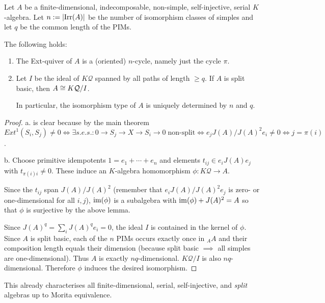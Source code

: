 \documentclass[fontsize=11pt,fleqn,a4paper]{scrartcl}
\begin{document}
\begin{theorem}
Let $A$ be a finite-dimensional, indecomposable, non-simple, self-injective, serial $K$-algebra. Let $n:=\lvert\operatorname{Irr}(A)\rvert$ be the number of isomorphism classes of simples and let $q$ be the common length of the PIMs.

The following holds:
\begin{enumerate}
\item The Ext-quiver of $A$ is a (oriented) $n$-cycle, namely just the cycle $\pi$.
\item Let $I$ be the ideal of $K\mathcal{Q}$ spanned by all paths of length $\geq q$. If $A$ is split basic, then $A\cong K\mathcal{Q}/I$.

In particular, the isomorphism type of $A$ is uniquely determined by $n$ and $q$.
\end{enumerate}
\end{theorem}
\begin{proof}
a. is clear because by the main theorem $Ext^1(S_i,S_j)\neq 0 \iff \exists s.e.s.: 0\to S_j \to X \to S_i \to 0\;\text{non-split}\iff e_j J(A)/J(A)^2 e_i \neq 0 \iff j=\pi(i)$.

\medbreak
b. Choose primitive idempotents $1=e_1+\cdots+e_n$ and elements $t_{ij}\in e_i J(A)e_j$ with $t_{\pi(i)i} \neq 0$. These induce an $K$-algebra homomorphism $\phi: K\mathcal{Q} \to A$.

Since the $t_{ij}$ span $J(A)/J(A)^2$ (remember that $e_i J(A)/J(A)^2 e_j$ is zero- or one-dimensional for all $i,j$), $\operatorname{im}(\phi)$ is a subalgebra with $\operatorname{im}(\phi)+J(A)^2=A$ so that $\phi$ is surjective by the above lemma.

Since $J(A)^q=\sum_i J(A)^q e_i = 0$, the ideal $I$ is contained in the kernel of $\phi$. Since $A$ is split basic, each of the $n$ PIMs occurs exactly once in ${_A A}$ and their composition length equals their dimension (because split basic $\implies$ all simples are one-dimensional). Thus $A$ is exactly $nq$-dimensional. $K\mathcal{Q}/I$ is also $nq$-dimensional. Therefore $\phi$ induces the desired isomorphism.
\end{proof}

\begin{remark}
This already characterises all finite-dimensional, serial, self-injective, and \emph{split} algebras up to Morita equivalence.
\end{remark}
\end{document}
